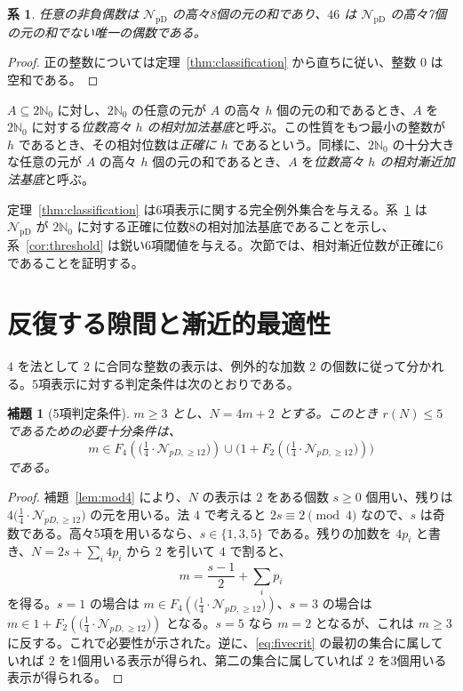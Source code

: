 \documentclass[12pt]{ltjsarticle}
\theoremstyle{plain}
\newtheorem{lemma}[theorem]{補題}
\newtheorem{corollary}[theorem]{系}
\theoremstyle{definition}
\theoremstyle{plain}
\newcommand{\NpD}{\mathcal{N}_{\mathrm{pD}}}
\newcommand{\Pset}{
  \bigl(\tfrac{1}{4}\cdot\mathcal{N}_{pD,\geq 12}\bigr)
}
\begin{document}
\begin{corollary}\label{cor:eight}
任意の非負偶数は $\NpD$ の高々8個の元の和であり、$46$ は $\NpD$ の高々7個の元の和でない唯一の偶数である。
\end{corollary}

\begin{proof}
正の整数については定理~\ref{thm:classification} から直ちに従い、整数 $0$ は空和である。
\end{proof}

$A\subseteq2\mathbb N_0$ に対し、$2\mathbb N_0$ の任意の元が $A$ の高々 $h$ 個の元の和であるとき、$A$ を $2\mathbb N_0$ に対する\emph{位数高々 $h$ の相対加法基底}と呼ぶ。この性質をもつ最小の整数が $h$ であるとき、その相対位数は\emph{正確に $h$} であるという。同様に、$2\mathbb N_0$ の十分大きな任意の元が $A$ の高々 $h$ 個の元の和であるとき、$A$ を\emph{位数高々 $h$ の相対漸近加法基底}と呼ぶ。

定理~\ref{thm:classification} は6項表示に関する完全例外集合を与える。系~\ref{cor:eight} は $\NpD$ が $2\mathbb N_0$ に対する正確に位数8の相対加法基底であることを示し、系~\ref{cor:threshold} は鋭い6項閾値を与える。次節では、相対漸近位数が正確に6であることを証明する。

\section{反復する隙間と漸近的最適性}\label{sec:asymptotic}

$4$ を法として $2$ に合同な整数の表示は、例外的な加数 $2$ の個数に従って分かれる。5項表示に対する判定条件は次のとおりである。

\begin{lemma}[5項判定条件]\label{lem:fivecrit}
$m\geq3$ とし、$N=4m+2$ とする。このとき $r(N)\leq5$ であるための必要十分条件は、
\begin{equation}\label{eq:fivecrit}
  m\in F_4(\Pset)\cup\bigl(1+F_2(\Pset)\bigr)
\end{equation}
である。
\end{lemma}

\begin{proof}
補題~\ref{lem:mod4} により、$N$ の表示は $2$ をある個数 $s\geq0$ 個用い、残りは $4\Pset$ の元を用いる。法 $4$ で考えると $2s\equiv2\pmod4$ なので、$s$ は奇数である。高々5項を用いるなら、$s\in\{1,3,5\}$ である。残りの加数を $4p_i$ と書き、$N=2s+\sum_i4p_i$ から $2$ を引いて $4$ で割ると、
\[
  m=\frac{s-1}{2}+\sum_i p_i
\]
を得る。$s=1$ の場合は $m\in F_4(\Pset)$、$s=3$ の場合は $m\in1+F_2(\Pset)$ となる。$s=5$ なら $m=2$ となるが、これは $m\geq3$ に反する。これで必要性が示された。逆に、\eqref{eq:fivecrit} の最初の集合に属していれば $2$ を1個用いる表示が得られ、第二の集合に属していれば $2$ を3個用いる表示が得られる。
\end{proof}
\end{document}
